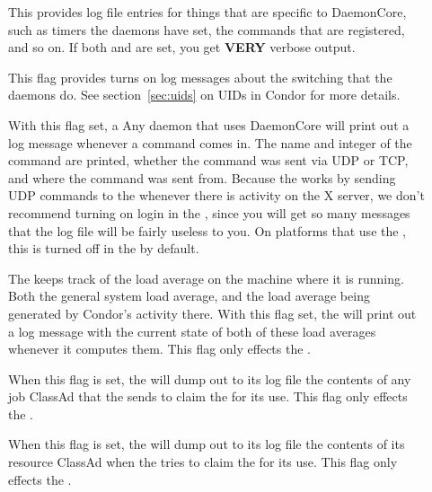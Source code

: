\begin{description}
\begin{description}
\item[] \label{dflag:daemoncore} This provides log
  file entries for things that are specific to DaemonCore, such as
  timers the daemons have set, the commands that are registered, and
  so on.  If both  and  are set,
  you get \textbf{VERY} verbose output.

\item[] \label{dflag:priv} This flag provides turns on log
  messages about the  switching that the daemons
  do.  See section~\ref{sec:uids} on UIDs in Condor for more details.

\item[] \label{dflag:command} With this flag set, a
  Any daemon that uses DaemonCore will print out a log message
  whenever a command comes in.  The name and integer of the command
  are printed, whether the command was sent via UDP or TCP, and where
  the command was sent from.  Because the  works by
  sending UDP commands to the  whenever there is
  activity on the X server, we don't recommend turning on
   login in the , since you will get so
  many messages that the log file will be fairly useless to you.  On
  platforms that use the , this is turned off in the
   by default.

\item[] \label{dflag:load} The  keeps track
  of the load average on the machine where it is running.  Both the
  general system load average, and the load average being generated by
  Condor's activity there.  With this flag set, the 
  will print out a log message with the current state of both of these
  load averages whenever it computes them.  This flag only effects the
  .
  
\item[] \label{dflag:job} When this flag is set, the
   will dump out to its log file the contents of any
  job ClassAd that the  sends to claim the
   for its use.  This flag only effects the
  .
  
\item[] \label{dflag:machine} When this flag is set,
  the  will dump out to its log file the contents of
  its resource ClassAd when the  tries to claim the
   for its use.  This flag only effects the
  .


\end{description}
\end{description}
